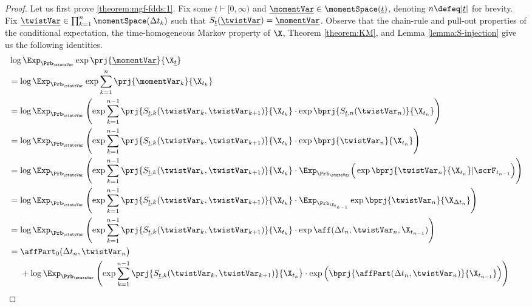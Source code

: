 \begin{proof}
  \label{proof:theorem:mgf-fdds}
  Let us first prove \ref{theorem:mgf-fdds:1}.
  Fix some $\underline t \vdash [0,\infty)$ and $\underline\momentVar \in \momentSpace(\underline t)$, denoting $n \defeq |\underline t|$ for brevity.
  Fix $\underline\twistVar \in \prod_{k=1}^n \momentSpace(\Delta t_k)$ such that $S_{\underline t}(\underline\twistVar) = \underline\momentVar$.
  Observe that the chain-rule and pull-out properties of the conditional expectation, the time-homogeneous Markov property of $\X$, Theorem \ref{theorem:KM}, and Lemma \ref{lemma:S-injection} give us the following identities.
  \begin{align}
    &\log\Exp_{\Prb_\stateVar} \exp\prj{\underline\momentVar}{\X_{\underline t}} \tag*{} \\
    &=\log\Exp_{\Prb_\stateVar} \exp\sum_{k=1}^n \prj{\momentVar_k}{\X_{t_k}} \\
    &= \log\Exp_{\Prb_\stateVar}\left( \exp\sum_{k=1}^{n-1} \prj{S_{\underline t, k}(\twistVar_k, \twistVar_{k+1})}{\X_{t_k}} \cdot \exp\bprj{S_{\underline t,n}(\twistVar_n)}{\X_{t_n}} \right) \\
    \label{eq:tower-start}
    &= \log\Exp_{\Prb_\stateVar}\left( \exp\sum_{k=1}^{n-1} \prj{S_{\underline t, k}(\twistVar_k, \twistVar_{k+1})}{\X_{t_k}} \cdot \exp\bprj{\twistVar_n}{\X_{t_n}} \right) \\
    &= \log\Exp_{\Prb_\stateVar}\left( \exp\sum_{k=1}^{n-1} \prj{S_{\underline t, k}(\twistVar_k, \twistVar_{k+1})}{\X_{t_k}} \cdot \Exp_{\Prb_\stateVar}\Big(\exp\bprj{\twistVar_n}{\X_{t_n}} |\scrF_{t_{n-1}} \Big) \right) \\
    &= \log\Exp_{\Prb_\stateVar}\left( \exp\sum_{k=1}^{n-1} \prj{S_{\underline t, k}(\twistVar_k, \twistVar_{k+1})}{\X_{t_k}} \cdot \Exp_{\Prb_{\X_{t_{n-1}}}}\exp\bprj{\twistVar_n}{\X_{\Delta t_n}}  \right) \\
    &= \log\Exp_{\Prb_\stateVar}\left( \exp\sum_{k=1}^{n-1} \prj{S_{\underline t, k}(\twistVar_k, \twistVar_{k+1})}{\X_{t_k}} \cdot \exp\aff(\Delta t_n, \twistVar_n, \X_{t_{n-1}})\right) \\
    &= \begin{aligned}[t]
      &\affPart_0(\Delta t_n, \twistVar_n\big) \\
      &+ \log\Exp_{\Prb_\stateVar}\left( \exp\sum_{k=1}^{n-1} \prj{S_{\underline t, k}(\twistVar_k, \twistVar_{k+1})}{\X_{t_k}} \cdot \exp\Big( \bprj{\affPart(\Delta t_n, \twistVar_n)}{\X_{t_{n-1}}} \Big)   \right) 
    \end{aligned}\\

\end{align}
\end{proof}
